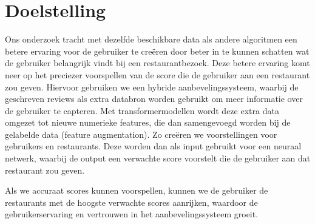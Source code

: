 \section{Doelstelling}
Ons onderzoek tracht met dezelfde beschikbare data als andere algoritmen een betere ervaring voor de gebruiker te creëren door beter in te kunnen schatten wat de gebruiker belangrijk vindt bij een restaurantbezoek. Deze betere ervaring komt neer op het preciezer voorspellen van de score die de gebruiker aan een restaurant zou geven. Hiervoor gebruiken we een hybride aanbevelingssysteem, waarbij de geschreven reviews als extra databron worden gebruikt om meer informatie over de gebruiker te capteren. Met transformermodellen wordt deze extra data omgezet tot nieuwe numerieke features, die dan samengevoegd worden bij de gelabelde data (feature augmentation). Zo creëren we voorstellingen voor gebruikers en restaurants. Deze worden dan als input gebruikt voor een neuraal netwerk, waarbij de output een verwachte score voorstelt die de gebruiker aan dat restaurant zou geven.


Als we accuraat scores kunnen voorspellen, kunnen we de gebruiker de restaurants met de hoogste verwachte scores aanrijken, waardoor de gebruikerservaring en vertrouwen in het aanbevelingssysteem groeit.
